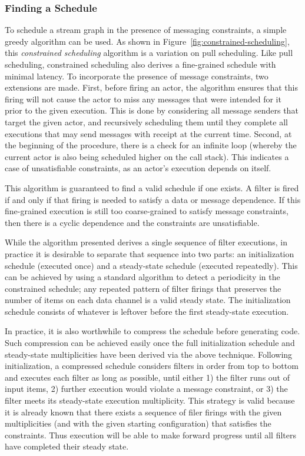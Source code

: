 \subsubsection*{Finding a Schedule}

To schedule a stream graph in the presence of messaging constraints, a
simple greedy algorithm can be used.  As shown in
Figure~\ref{fig:constrained-scheduling}, this {\it constrained
scheduling} algorithm is a variation on pull scheduling.  Like pull
scheduling, constrained scheduling also derives a fine-grained
schedule with minimal latency.  To incorporate the presence of message
constraints, two extensions are made.  First, before firing an actor,
the algorithm ensures that this firing will not cause the actor to
miss any messages that were intended for it prior to the given
execution.  This is done by considering all message senders that
target the given actor, and recursively scheduling them until they
complete all executions that may send messages with receipt at the
current time.  Second, at the beginning of the procedure, there is a
check for an infinite loop (whereby the current actor is also being
scheduled higher on the call stack).  This indicates a case of
unsatisfiable constraints, as an actor's execution depends on itself.

This algorithm is guaranteed to find a valid schedule if one exists.
A filter is fired if and only if that firing is needed to satisfy a
data or message dependence.  If this fine-grained execution is still
too coarse-grained to satisfy message constraints, then there is a
cyclic dependence and the constraints are unsatisfiable.

While the algorithm presented derives a single sequence of filter
executions, in practice it is desirable to separate that sequence into
two parts: an initialization schedule (executed once) and a
steady-state schedule (executed repeatedly).  This can be achieved by
using a standard algorithm to detect a periodicity in the constrained
schedule; any repeated pattern of filter firings that preserves the
number of items on each data channel is a valid steady state.  The
initialization schedule consists of whatever is leftover before the
first steady-state execution.

In practice, it is also worthwhile to compress the schedule before
generating code.  Such compression can be achieved easily once the
full initialization schedule and steady-state multiplicities have been
derived via the above technique.  Following initialization, a
compressed schedule considers filters in order from top to bottom and
executes each filter as long as possible, until either 1) the filter
runs out of input items, 2) further execution would violate a message
constraint, or 3) the filter meets its steady-state execution
multiplicity.  This strategy is valid because it is already known that
there exists a sequence of filer firings with the given multiplicities
(and with the given starting configuration) that satisfies the
constraints.  Thus execution will be able to make forward progress
until all filters have completed their steady state.


